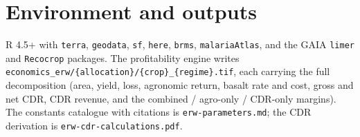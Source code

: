 \documentclass[openany]{book}
\begin{document}
\section{Environment and outputs}

R 4.5+ with \texttt{terra}, \texttt{geodata}, \texttt{sf}, \texttt{here},
\texttt{brms}, \texttt{malariaAtlas}, and the GAIA \texttt{limer} and
\texttt{Recocrop} packages. The profitability engine writes
\texttt{economics\_erw/\{allocation\}/\{crop\}\_\{regime\}.tif}, each carrying the
full decomposition (area, yield, loss, agronomic return, basalt rate and cost,
gross and net CDR, CDR revenue, and the combined / agro-only / CDR-only margins).
The constants catalogue with citations is \texttt{erw-parameters.md}; the CDR
derivation is \texttt{erw-cdr-calculations.pdf}.

\backmatter
\renewcommand\bibname{{References}}

\nocite{*}

\end{document}
